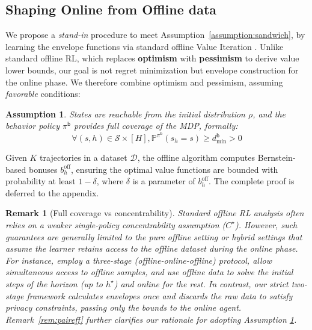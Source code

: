 \documentclass[twoside]{article}
\newtheorem{remark}{Remark}
\newtheorem{assumption}{Assumption}
\newcommand{\off}{\mathrm{off}} %
\newcommand{\boff}{b_h^{\off}} %
\begin{document}
\subsection{Shaping Online from Offline data}

We propose a \emph{stand-in} procedure to meet Assumption~\ref{assumption:sandwich}, by learning the envelope functions via standard offline Value Iteration . Unlike standard offline RL, which replaces \textbf{optimism} with \textbf{pessimism} to derive value lower bounds, our goal is not regret minimization but envelope construction for the online phase. We therefore combine optimism and pessimism, assuming \emph{favorable} conditions:

\begin{assumption} \label{assumption:fc} States are reachable from the initial distribution $\rho$, and the behavior policy $\pi^{\mathsf{b}}$ provides full coverage of the MDP, formally: 
\begin{equation}
    \forall (s,h) \in \mathcal{S}\times[H], \mathbb{P}^{\pi^{\mathsf{b}}}(s_h = s) \geq d^{\mathsf b}_{\min} > 0
\end{equation}
\end{assumption}


Given $K$ trajectories in a dataset $\mathcal{D}$, the offline algorithm computes Bernstein-based bonuses $\boff$, ensuring the optimal value functions are bounded with probability at least $1-\delta$, where $\delta$ is a parameter of $\boff$. The complete proof is deferred to the appendix.

\begin{remark}[Full coverage vs concentrability]
Standard offline RL analysis often relies on a weaker single-policy concentrability assumption ($C^\star$). However, such guarantees are generally limited to the pure offline setting or hybrid settings that assume the learner retains access to the offline dataset during the online phase. For instance, \cite{li_2023} employ a three-stage (offline-online-offline) protocol, \cite{pattanaik_2025} allow simultaneous access to offline samples, and \cite{xie_policy_2021} use offline data to solve the initial steps of the horizon (up to $h^{\star}$) and online for the rest. In contrast, our strict two-stage framework calculates envelopes once and discards the raw data to satisfy privacy constraints, passing only the bounds to the online agent. 
Remark~\ref{rem:paireff} further clarifies our rationale for adopting Assumption \ref{assumption:fc}.
\end{remark}
\end{document}

